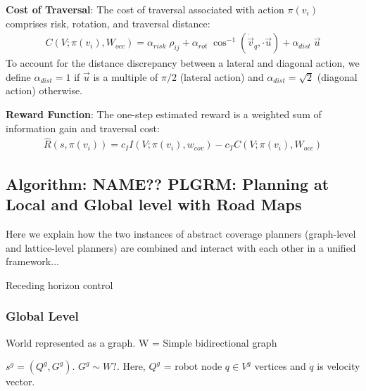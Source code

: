 \documentclass{article}
\newcommand{\ph}[1]{{\textbf{#1}:}} %
\begin{document}
\ph{Cost of Traversal} The cost of traversal associated with action $\pi(v_i)$ comprises risk, rotation, and traversal distance:
\begin{align}
    C(V; \pi(v_i), W_{occ}) = \alpha_{risk} \; \rho_{ij} + \alpha_{rot} \;  \cos^{-1}(\dot{\vec{v}}_q, \cdot \vec{u}) + \alpha_{dist} \; \vec{u}
    \label{eq:traversal_cost}
\end{align}
To account for the distance discrepancy between a lateral and diagonal action, we define $\alpha_{dist}=1$ if $\vec{u}$ is a multiple of $\pi/2$ (lateral action) and $\alpha_{dist}=\sqrt{2}$ (diagonal action) otherwise.






\ph{Reward Function} The one-step estimated reward is a weighted sum of information gain and traversal cost:
\begin{align}
    \hat{R}(s, \pi(v_i)) = c_{I} I(V; \pi(v_i), w_{cov}) - c_{T}  C(V; \pi(v_i), W_{occ})
    \label{eq:lattice_reward}
\end{align}


\subsection{Algorithm: NAME?? PLGRM: Planning at Local and Global level with Road Maps}

Here we explain how the two instances of abstract coverage planners (graph-level and lattice-level planners) are combined and interact with each other in a unified framework...

Receding horizon control



\subsubsection{Global Level}
World represented as a graph. W = Simple bidirectional graph

$s^g = (Q^g, G^g)$. $G^g \sim W?$. Here, $Q^g$ = robot node $q \in V^g$ vertices  and $\dot{q}$ is velocity vector.
\end{document}
